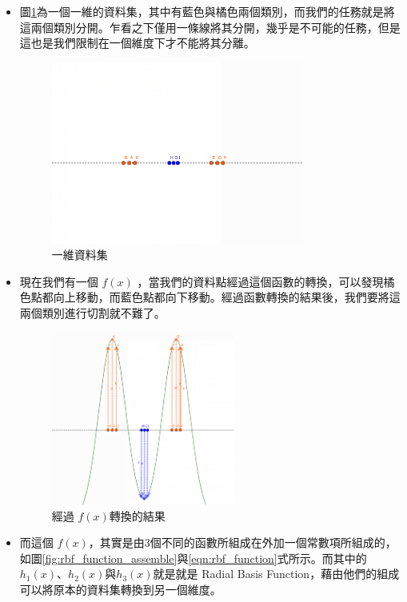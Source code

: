 \begin{itemize}
	\item

	      圖\ref{fig:rbf_introduction_not_transfer}為一個一維的資料集，其中有藍色與橘色兩個類別，而我們的任務就是將這兩個類別分開。乍看之下僅用一條線將其分開，幾乎是不可能的任務，但是這也是我們限制在一個維度下才不能將其分離。



	      \begin{figure}[h]
		      \centering
		      \includegraphics[height=6cm]{./pic/vM4xT9rm.png}
		      \caption{一維資料集}
		      \label{fig:rbf_introduction_not_transfer}
	      \end{figure}

	\item
	      現在我們有一個 \(f(x)\) ，當我們的資料點經過這個函數的轉換，可以發現橘色點都向上移動，而藍色點都向下移動。經過函數轉換的結果後，我們要將這兩個類別進行切割就不難了。

	      \begin{figure}[h]
		      \centering
		      \includegraphics[width=6cm]{./pic/7VM3Lid5.png}
		      \caption{經過 \(f(x)\)轉換的結果 }
		      \label{fig:rbf_with_function}
	      \end{figure}


	\item
	      而這個 \(f(x)\)，其實是由3個不同的函數所組成在外加一個常數項所組成的，如圖\ref{fig:rbf_function_assemble}與\ref{eqn:rbf_function}式所示。而其中的 \(h_1(x)\)、\(h_2(x)\)與\(h_3(x)\)就是就是 Radial Basis Function，藉由他們的組成可以將原本的資料集轉換到另一個維度。


\end{itemize}
